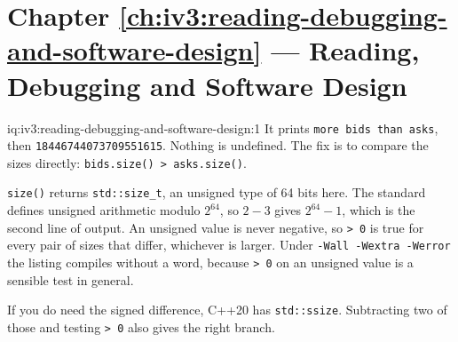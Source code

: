 \section*{Chapter \ref{ch:iv3:reading-debugging-and-software-design} --- Reading, Debugging and Software Design}

\begin{solution}{iq:iv3:reading-debugging-and-software-design:1}
It prints \texttt{more bids than asks}, then \texttt{18446744073709551615}. Nothing is undefined. The fix is to compare the sizes directly: \texttt{bids.size() > asks.size()}.

\texttt{size()} returns \texttt{std::size\_t}, an unsigned type of 64 bits here. The standard defines unsigned arithmetic modulo $2^{64}$, so $2 - 3$ gives $2^{64} - 1$, which is the second line of output. An unsigned value is never negative, so \texttt{> 0} is true for every pair of sizes that differ, whichever is larger. Under \texttt{-Wall -Wextra -Werror} the listing compiles without a word, because \texttt{> 0} on an unsigned value is a sensible test in general.

If you do need the signed difference, C++20 has \texttt{std::ssize}. Subtracting two of those and testing \texttt{> 0} also gives the right branch.



\end{solution}

